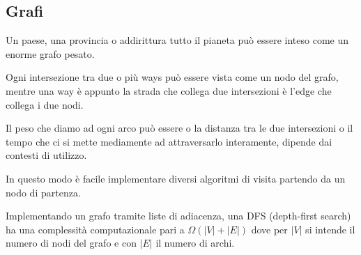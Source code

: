 \documentclass[12pt,a4paper,openright,twoside]{report}
\begin{document}
\subsection{Grafi}
Un paese, una provincia o addirittura tutto il pianeta può essere inteso come un enorme grafo pesato.
 
Ogni intersezione tra due o più ways può essere vista come un nodo del grafo, mentre una way è appunto la strada che collega due intersezioni è l'edge che collega i due nodi.

Il peso che diamo ad ogni arco può essere o la distanza tra le due intersezioni o il tempo che ci si mette mediamente ad attraversarlo interamente, dipende dai contesti di utilizzo.

In questo modo è facile implementare diversi algoritmi di visita partendo da un nodo di partenza.

Implementando un grafo tramite liste di adiacenza, una DFS (depth-first search) ha una complessità computazionale pari a $\Omega(|V| + |E|) $ dove per $\left|V \right|$ si intende il numero di nodi del grafo e con $\left| E \right|$ il numero di archi.



\clearpage{\pagestyle{empty}\cleardoublepage}
\end{document}
